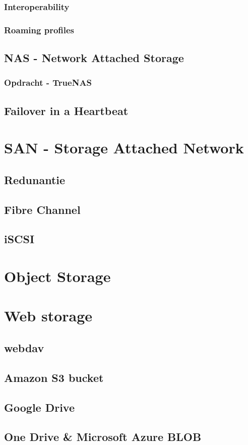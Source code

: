 \documentclass[a4paper,12pt,twoside,openright,titlepage]{book}
\begin{document}
\subsection{Interoperability}

\subsection{Roaming profiles}
\section{NAS - Network Attached Storage}

\subsection{Opdracht - TrueNAS}

\section{Failover in a Heartbeat}


\chapter{SAN - Storage Attached Network}

\section{Redunantie}

\section{Fibre Channel}

\section{iSCSI}


\chapter{Object Storage}


\chapter{Web storage}

\section{webdav}

\section{Amazon S3 bucket}
\section{Google Drive}
\section{One Drive \& Microsoft Azure BLOB}


\printindex
\end{document}
